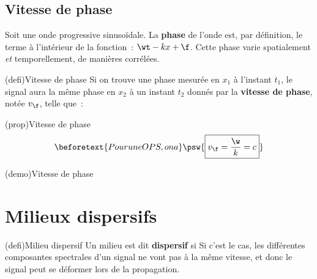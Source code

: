 \documentclass[../../main/main.tex]{subfiles}
\begin{document}
\subsection{Vitesse de phase}

Soit une onde progressive sinusoïdale. La \textbf{phase} de l'onde est, par
définition, le terme à l'intérieur de la fonction~: $\wt-kx+\f$. Cette phase
varie spatialement \textit{et} temporellement, de manières corrélées.

\begin{tcb}[sidebyside, sidebyside align=top, righthand ratio=.2](defi){Vitesse de phase}
	Si on trouve une phase mesurée en $x_1$ à l'instant $t_1$, le signal aura la
	même phase en $x_2$ à un instant $t_2$ donnés par la \textbf{vitesse de
		phase}, notée $v_\f$, telle que~:
	\psw{\[\boxed{v_\f = \frac{x_2-x_1}{t_2-t_1}}\]}
	\tcblower
	\psw{%
		\[
			\si{m.s^{-1}}
		\]
	}%
	\vspace{-15pt}
\end{tcb}

\begin{tcb*}(prop){Vitesse de phase}
	\vspace{-15pt}
	\begin{gather*}
		\beforetext{Pour une OPS, on a}
		\psw{%
			\boxed{v_{\f} = \frac{\w}{k} = c}
		}%
	\end{gather*}
	\vspace{-15pt}
\end{tcb*}

\begin{tcb*}(demo){Vitesse de phase}
	\vspace{-15pt}
	\vspace{-10pt}
\end{tcb*}

\section{Milieux dispersifs}

\begin{tcb*}(defi){Milieu dispersif}
	Un milieu est dit \textbf{dispersif} si
	\bigbreak
	Si c'est le cas, les différentes composantes spectrales d'un signal ne vont
	pas à la même vitesse, et donc le signal peut se déformer lors de la
	propagation.
\end{tcb*}
\end{document}
